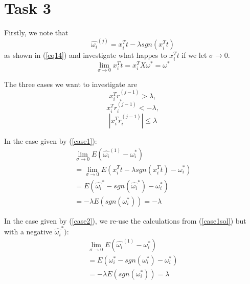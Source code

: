 \documentclass{article}
\begin{document}
\section{Task 3}
Firstly, we note that 
\begin{equation}
    \hat{\omega_i}^{(j)} = x_i^T t - \lambda sgn(x_i^T t)
\end{equation}
as shown in (\ref{eq14}) and investigate what happes to $x_i^T t$ if we let $\sigma \to 0$.
\begin{equation}
    \lim\limits_{\sigma \to 0} x_i^T t = x_i^T X \omega^* = \omega^*
\end{equation}

The three cases we want to investigate are
\begin{equation} \label{case1}
    x_i^T r_i^{(j-1)} > \lambda ,
\end{equation}
\begin{equation} \label{case2}
    x_i^T r_i^{(j-1)} < -\lambda ,
\end{equation}
\begin{equation} \label{case3}
    |x_i^T r_i^{(j-1)}| \leq \lambda 
\end{equation}

In the case given by (\ref{case1}):
\begin{equation} \label{case1sol}
\begin{split}
    \lim\limits_{\sigma \to 0} E(\hat{\omega_i}^{(1)} - \omega_i^{*}) \\
    = \lim\limits_{\sigma \to 0} E(x_i^T t - \lambda sgn(x_i^T t) - \omega_i^{*}) \\
    = E(\hat{\omega_i}^{*} - sgn(\hat{\omega_i}^{*}) - \omega_i^{*}) \\
    = -\lambda E(sgn(\omega_i^{*})) = -\lambda
\end{split}
\end{equation}

In the case given by (\ref{case2}), we re-use the calculations from (\ref{case1sol}) but with a negative $\hat{\omega_i}^{*})$:
\begin{equation}
\begin{split}
    \lim\limits_{\sigma \to 0} E(\hat{\omega_i}^{(1)} - \omega_i^{*}) \\
    = E(\omega_i^{*} - sgn(\omega_i^{*}) - \omega_i^{*}) \\
    = -\lambda E(sgn(\omega_i^{*})) = \lambda
\end{split}
\end{equation}
\end{document}
